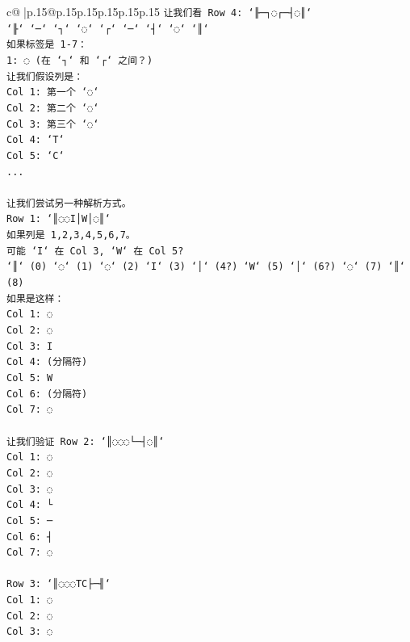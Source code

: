 \documentclass{article}
\begin{document}
{\begin{supertabular}{c@{$\;$}|p{.15\linewidth}@{}p{.15\linewidth}p{.15\linewidth}p{.15\linewidth}p{.15\linewidth}p{.15\linewidth}}
{{{\texttt{让我们看 Row 4: `╟─┐◌┌─┤◌║`} \\
\texttt{`╟` `─` `┐` `◌` `┌` `─` `┤` `◌` `║`} \\
\texttt{如果标签是 1{-}7：} \\
\texttt{1: ◌ (在 `┐` 和 `┌` 之间？)} \\
\texttt{让我们假设列是：} \\
\texttt{Col 1: 第一个 `◌`} \\
\texttt{Col 2: 第二个 `◌`} \\
\texttt{Col 3: 第三个 `◌`} \\
\texttt{Col 4: `T`} \\
\texttt{Col 5: `C`} \\
\texttt{...} \\
\\ 
\texttt{让我们尝试另一种解析方式。} \\
\texttt{Row 1: `║◌◌I│W│◌║`} \\
\texttt{如果列是 1,2,3,4,5,6,7。} \\
\texttt{可能 `I` 在 Col 3, `W` 在 Col 5?} \\
\texttt{`║` (0) `◌` (1) `◌` (2) `I` (3) `│` (4?) `W` (5) `│` (6?) `◌` (7) `║` (8)} \\
\texttt{如果是这样：} \\
\texttt{Col 1: ◌} \\
\texttt{Col 2: ◌} \\
\texttt{Col 3: I} \\
\texttt{Col 4: (分隔符)} \\
\texttt{Col 5: W} \\
\texttt{Col 6: (分隔符)} \\
\texttt{Col 7: ◌} \\
\\ 
\texttt{让我们验证 Row 2: `║◌◌◌└─┤◌║`} \\
\texttt{Col 1: ◌} \\
\texttt{Col 2: ◌} \\
\texttt{Col 3: ◌} \\
\texttt{Col 4: └} \\
\texttt{Col 5: ─} \\
\texttt{Col 6: ┤} \\
\texttt{Col 7: ◌} \\
\\ 
\texttt{Row 3: `║◌◌◌TC├─╢`} \\
\texttt{Col 1: ◌} \\
\texttt{Col 2: ◌} \\
\texttt{Col 3: ◌} \\
}}}
\end{supertabular}}
\end{document}

